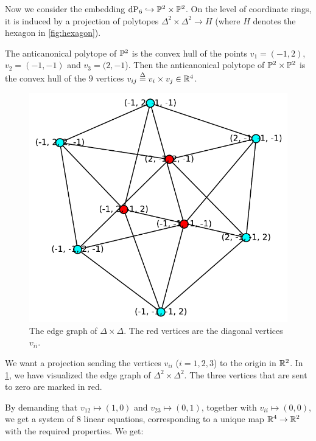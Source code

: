 \begin{example}
\label{example:p2p2}
Now we consider the embedding $\dP6 \hookrightarrow \P^2 \times \P^2$. On the level of coordinate rings, it is induced by a projection of polytopes $\Delta^2 \times \Delta^2 \to H$ (where $H$ denotes the hexagon in \cref{fig:hexagon}).

The anticanonical polytope of $\P^2$ is the convex hull of the points $v_1=(-1,2)$, $v_2=(-1,-1)$ and $v_3=(2,-1$). Then the anticanonical polytope of $\P^2 \times \P^2$ is the convex hull of the $9$ vertices $v_{ij} \stackrel{\Delta}{=} v_i \times v_j \in \R^4$.

\begin{figure}
  \centering
  \includegraphics[scale=0.7]{./figures/grafDD.pdf}
  \caption{The edge graph of $\Delta \times \Delta$. The red vertices are the diagonal vertices $v_{ii}$.}
  \label{fig:edgegraphDD}
\end{figure}

We want a projection sending the vertices $v_{ii}$ ($i=1,2,3$) to the origin in $\R^2$. In \cref{fig:edgegraphDD}, we have visualized the edge graph of $\Delta^2 \times \Delta^2$. The three vertices that are sent to zero are marked in red.

By demanding that $v_{12} \mapsto (1,0)$ and $v_{23} \mapsto (0,1)$, together with $v_{ii} \mapsto (0,0)$, we get a system of $8$ linear equations, corresponding to a unique map $\R^4 \to \R^2$ with the required properties. We get:


\end{example}
